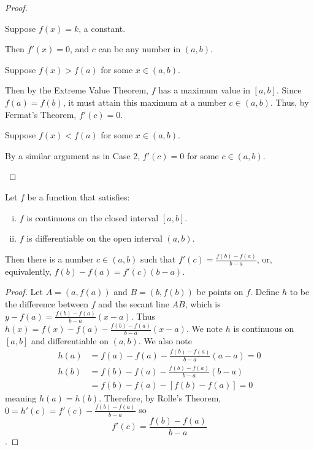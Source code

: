 \documentclass[a4paper,8pt]{article}
\begin{document}
\begin{outline}
    \begin{proof}
      \begin{proofcases}
        \item
          Suppose \(f(x) = k\), a constant.

          Then \(f'(x) = 0\), and \(c\) can be any number in \((a, b)\).
        \item
          Suppose \(f(x) > f(a)\) for some \(x \in (a, b)\).

          Then by the Extreme Value Theorem, \(f\) has a
          maximum value in \([a, b]\). Since \(f(a)=f(b)\), it must attain this maximum at a number \(c \in (a, b)\).
          Thus, by Fermat's Theorem, \(f'(c) = 0\).
        \item
          Suppose \(f(x) < f(a)\) for some \(x \in (a, b)\).

          By a similar argument as in Case 2, \(f'(c) = 0\) for some \(c \in (a, b)\).
      \end{proofcases}
    \end{proof}

    Let \(f\) be a function that satisfies:
    \begin{enumerate}[i.]
      \item \(f\) is continuous on the closed interval \([a, b]\).
      \item \(f\) is differentiable on the open interval \((a, b)\).
    \end{enumerate}
    Then there is a number \(c \in (a, b)\) such that \(f'(c) = \frac{f(b)-f(a)}{b-a}\), or, equivalently,
    \(f(b)-f(a) = f'(c)(b-a)\).

    \begin{proof}
      Let \(A = (a, f(a))\) and \(B = (b, f(b))\) be points on \(f\). Define \(h\) to be the difference between
      \(f\) and the secant line \(AB\), which is \(y - f(a) = \frac{f(b)-f(a)}{b-a}(x-a)\). Thus \(h(x) =
      f(x)-f(a)-\frac{f(b)-f(a)}{b-a}(x-a)\). We note \(h\) is continuous on \([a, b]\) and differentiable on
      \((a, b)\). We also note
      \begin{align*}
        h(a) &= f(a)-f(a)-\frac{f(b)-f(a)}{b-a}(a-a) = 0\\
        h(b) &= f(b)-f(a)-\frac{f(b)-f(a)}{b-a}(b-a)\\
             &= f(b)-f(a)-[f(b)-f(a)] = 0
      \end{align*}
      meaning \(h(a)=h(b)\). Therefore, by Rolle's Theorem, \(0 = h'(c) = f'(c) -
      \frac{f(b)-f(a)}{b-a}\) so \[f'(c) = \frac{f(b)-f(a)}{b-a}\].
    \end{proof}


\end{outline}
\end{document}
